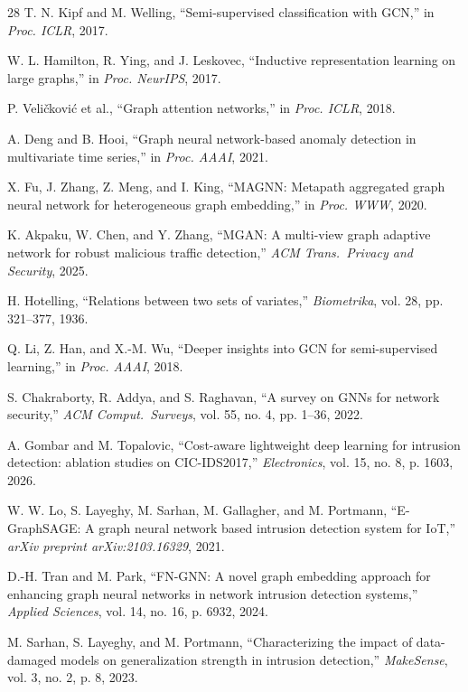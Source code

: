 \documentclass[conference]{IEEEtran}
\begin{document}
\begin{thebibliography}{28}
T. N. Kipf and M. Welling, ``Semi-supervised classification with GCN,'' in \emph{Proc. ICLR}, 2017.

W. L. Hamilton, R. Ying, and J. Leskovec, ``Inductive representation learning on large graphs,'' in \emph{Proc. NeurIPS}, 2017.

P. Veli\v{c}kovi\'{c} et al., ``Graph attention networks,'' in \emph{Proc. ICLR}, 2018.

A. Deng and B. Hooi, ``Graph neural network-based anomaly detection in multivariate time series,'' in \emph{Proc. AAAI}, 2021.

X. Fu, J. Zhang, Z. Meng, and I. King, ``MAGNN: Metapath aggregated graph neural network for heterogeneous graph embedding,'' in \emph{Proc. WWW}, 2020.

K. Akpaku, W. Chen, and Y. Zhang, ``MGAN: A multi-view graph adaptive network for robust malicious traffic detection,'' \emph{ACM Trans.\ Privacy and Security}, 2025.

H. Hotelling, ``Relations between two sets of variates,'' \emph{Biometrika}, vol. 28, pp. 321--377, 1936.

Q. Li, Z. Han, and X.-M. Wu, ``Deeper insights into GCN for semi-supervised learning,'' in \emph{Proc. AAAI}, 2018.

S. Chakraborty, R. Addya, and S. Raghavan, ``A survey on GNNs for network security,'' \emph{ACM Comput.\ Surveys}, vol. 55, no. 4, pp. 1--36, 2022.

A. Gombar and M. Topalovic, ``Cost-aware lightweight deep learning for intrusion detection: ablation studies on CIC-IDS2017,'' \emph{Electronics}, vol. 15, no. 8, p. 1603, 2026.

W. W. Lo, S. Layeghy, M. Sarhan, M. Gallagher, and M. Portmann, ``E-GraphSAGE: A graph neural network based intrusion detection system for IoT,'' \emph{arXiv preprint arXiv:2103.16329}, 2021.

D.-H. Tran and M. Park, ``FN-GNN: A novel graph embedding approach for enhancing graph neural networks in network intrusion detection systems,'' \emph{Applied Sciences}, vol. 14, no. 16, p. 6932, 2024.

M. Sarhan, S. Layeghy, and M. Portmann, ``Characterizing the impact of data-damaged models on generalization strength in intrusion detection,'' \emph{MakeSense}, vol. 3, no. 2, p. 8, 2023.


\end{thebibliography}
\end{document}
